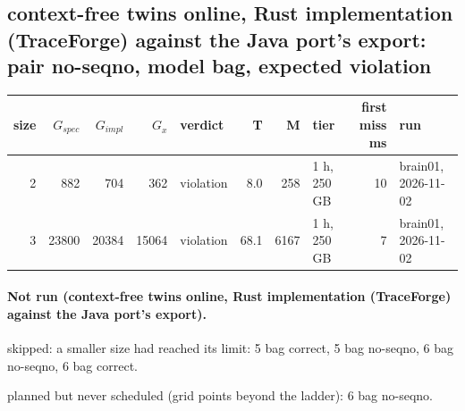 \documentclass[10pt]{article}
\begin{document}
\subsection*{context-free twins online, Rust implementation (TraceForge) against the Java port's export: pair \textsf{no-seqno}, model bag, expected violation}
\begin{longtable}{@{}rrrrlrrlrl@{}}
\toprule
size & $G_{\mathit{spec}}$ & $G_{\mathit{impl}}$ & $G_x$ & verdict & T & M & tier & first miss ms & run \\
\midrule
\endhead
\color{red} 2 & 882 & 704 & 362 & violation & 8.0 & 258 & 1 h, 250 GB & 10 & brain01, 2026-11-02 \\
\color{red} 3 & 23800 & 20384 & 15064 & violation & 68.1 & 6167 & 1 h, 250 GB & 7 & brain01, 2026-11-02 \\
\bottomrule
\end{longtable}
\paragraph{Not run (context-free twins online, Rust implementation (TraceForge) against the Java port's export).}
skipped: a smaller size had reached its limit: 5 bag correct, 5 bag no-seqno, 6 bag no-seqno, 6 bag correct.\par
planned but never scheduled (grid points beyond the ladder): 6 bag no-seqno.\par
\end{document}
